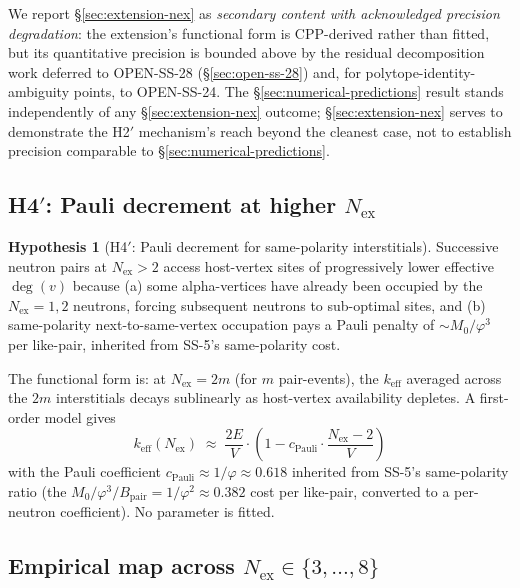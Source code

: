 \documentclass[11pt,letterpaper]{article}
\theoremstyle{definition}
\newtheorem{hypothesis}[theorem]{Hypothesis}
\newcommand{\Mzero}{M_0}
\newcommand{\phig}{\varphi}
\newcommand{\Bpair}{B_{\text{pair}}}
\newcommand{\Nex}{N_{\text{ex}}}
\newcommand{\degv}{\deg(v)}
\begin{document}
We report \S\ref{sec:extension-nex} as \emph{secondary content with acknowledged precision degradation}: the extension's functional form is CPP-derived rather than fitted, but its quantitative precision is bounded above by the residual decomposition work deferred to OPEN-SS-28 (\S\ref{sec:open-ss-28}) and, for polytope-identity-ambiguity points, to OPEN-SS-24. The \S\ref{sec:numerical-predictions} result stands independently of any \S\ref{sec:extension-nex} outcome; \S\ref{sec:extension-nex} serves to demonstrate the H2$'$ mechanism's reach beyond the cleanest case, not to establish precision comparable to \S\ref{sec:numerical-predictions}.

\subsection{H4$'$: Pauli decrement at higher $\Nex$}
\label{sec:h4prime}

\begin{hypothesis}[H4$'$: Pauli decrement for same-polarity interstitials]
\label{hyp:h4prime}
Successive neutron pairs at $\Nex > 2$ access host-vertex sites of progressively lower effective $\degv$ because (a) some alpha-vertices have already been occupied by the $\Nex = 1, 2$ neutrons, forcing subsequent neutrons to sub-optimal sites, and (b) same-polarity next-to-same-vertex occupation pays a Pauli penalty of $\sim \Mzero/\phig^3$ per like-pair, inherited from SS-5's same-polarity cost.
\end{hypothesis}

The functional form is: at $\Nex = 2m$ (for $m$ pair-events), the $k_{\text{eff}}$ averaged across the $2m$ interstitials decays sublinearly as host-vertex availability depletes. A first-order model gives
\begin{equation}
  k_{\text{eff}}(\Nex) \;\approx\; \frac{2E}{V} \cdot \left(1 - c_{\text{Pauli}} \cdot \frac{\Nex - 2}{V}\right)
  \label{eq:h4prime}
\end{equation}
with the Pauli coefficient $c_{\text{Pauli}} \approx 1/\phig \approx 0.618$ inherited from SS-5's same-polarity ratio (the $\Mzero/\phig^3 / \Bpair = 1/\phig^2 \approx 0.382$ cost per like-pair, converted to a per-neutron coefficient). No parameter is fitted.

\subsection{Empirical map across $\Nex \in \{3, \ldots, 8\}$}
\label{sec:ext-empirical-map}
\end{document}
